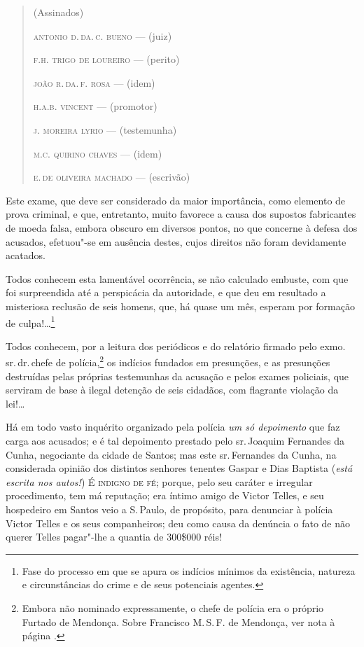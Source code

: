 \begin{quote}
\noindent(Assinados)

\noindent\textsc{antonio d.\,da.\,c. bueno} --- (juiz)

\noindent\textsc{f.h. trigo de loureiro} --- (perito)

\noindent\textsc{joão r.\,da.\,f. rosa} --- (idem)

\noindent\textsc{h.a.b. vincent} --- (promotor)

\noindent\textsc{j. moreira lyrio} --- (testemunha)

\noindent\textsc{m.c. quirino chaves} --- (idem)

\noindent\textsc{e.\,de oliveira machado} --- (escrivão)
\end{quote}

\asterisc

Este exame, que deve ser considerado da maior importância, como elemento
de prova criminal, e que, entretanto, muito favorece a causa dos
supostos fabricantes de moeda falsa, embora obscuro em diversos pontos,
no que concerne à defesa dos acusados, efetuou"-se em ausência destes,
cujos direitos não foram devidamente acatados.

Todos conhecem esta lamentável ocorrência, se não calculado embuste, com
que foi surpreendida até a perspicácia da autoridade, e que deu em
resultado a misteriosa reclusão de seis homens, que, há quase um mês,
esperam por formação de culpa!\ldots{}\footnote{Fase do processo em que se
  apura os indícios mínimos da existência, natureza e circunstâncias do
  crime e de seus potenciais agentes.}

Todos conhecem, por a leitura dos periódicos e do relatório firmado pelo
exmo.\,sr.\,dr.\,chefe de polícia,\footnote{Embora não nominado
  expressamente, o chefe de polícia era o próprio Furtado de Mendonça.
  Sobre Francisco M.\,S.\,F. de Mendonça, ver nota à página \pageref{fmfm}.} os
indícios fundados em presunções, e as presunções destruídas pelas
próprias testemunhas da acusação e pelos exames policiais, que serviram
de base à ilegal detenção de seis cidadãos, com flagrante violação da
lei!\ldots{}

Há em todo vasto inquérito organizado pela polícia \emph{um só
depoimento} que faz carga aos acusados; e é tal depoimento prestado pelo
sr.\,Joaquim Fernandes da Cunha, negociante da cidade de Santos; mas este
sr.\,Fernandes da Cunha, na considerada opinião dos distintos senhores
tenentes Gaspar e Dias Baptista (\emph{está escrita nos autos!}) É
\textsc{indigno de fé}; porque, pelo seu caráter e irregular procedimento, tem má
reputação; era íntimo amigo de Victor Telles, e seu hospedeiro em Santos
veio a S.\,Paulo, de propósito, para denunciar à polícia Victor Telles e
os seus companheiros; deu como causa da denúncia o fato de não querer
Telles pagar"-lhe a quantia de 300\$000 réis!

